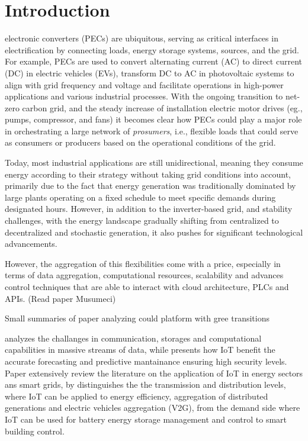 
\section{Introduction}


 electronic converters (PECs) are ubiquitous, serving as critical interfaces in electrification by connecting loads,
 energy storage systems, sources, and the grid. For example, PECs are used to convert alternating current (AC) to direct current (DC) 
 in electric vehicles (EVs), transform DC to AC in photovoltaic systems to align with grid frequency and voltage and facilitate operations in high-power applications and various industrial processes.
 With the ongoing transition to net-zero carbon grid, and the steady increase of installation electric motor drives (eg., pumps, compressor, and fans)  
it becomes clear how PECs could play a major role in orchestrating a large network of \textit{prosumers}, i.e., flexible loads that could serve as consumers or producers based on the operational conditions of the
grid.  




Today, most industrial applications are still unidirectional, meaning they consume energy according to their strategy without taking grid conditions into account, primarily due to the fact that energy generation was traditionally dominated by large plants operating on a fixed schedule to meet specific demands during designated hours.
However, in addition to the inverter-based grid, and stability challenges,
with the energy landscape gradually shifting from centralized to decentralized and stochastic generation, it also pushes for significant technological advancements. 


However, the aggregation of this flexibilities come with a price,
especially in terms of data aggregation, computational resources, scalability and advances control 
techniques that are able to interact with cloud architecture, PLCs and APIs. (Read paper Musumeci) 


Small summaries of paper analyzing could platform with gree transitions


\cite{bagherzadeh2020integration} analyzes the challanges in communication, storages and computational capabilities in 
massive streams of data, while \cite{shahinzadeh2018green} presents how IoT benefit the accurate forecasting and predictive mantainance ensuring high security levels. 
Paper \cite{hossein2020internet} extensively review the literature on the application of IoT in energy sectors ans smart grids, by 
distinguishes the the transmission and distribution levels, where IoT can be applied to energy efficiency, aggregation of distributed generations and electric vehicles
aggregation (V2G), from the demand side where IoT can be used for battery energy storage management and control to smart building control. 


